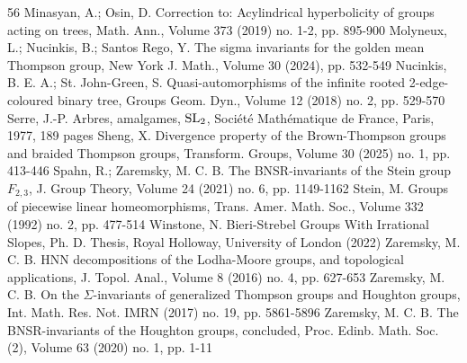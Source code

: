 \begin{thebibliography}{56}
Minasyan, A.; Osin, D. Correction to: Acylindrical hyperbolicity of groups acting on trees, Math. Ann., Volume 373 (2019) no. 1-2, pp. 895-900
Molyneux, L.; Nucinkis, B.; Santos Rego, Y. The sigma invariants for the golden mean Thompson group, New York J. Math., Volume 30 (2024), pp. 532-549
Nucinkis, B. E. A.; St. John-Green, S. Quasi-automorphisms of the infinite rooted 2-edge-coloured binary tree, Groups Geom. Dyn., Volume 12 (2018) no. 2, pp. 529-570
Serre, J.-P. Arbres, amalgames, ${\rm {SL}}_{2}$, Société Mathématique de France, Paris, 1977, 189 pages
Sheng, X. Divergence property of the Brown-Thompson groups and braided Thompson groups, Transform. Groups, Volume 30 (2025) no. 1, pp. 413-446
Spahn, R.; Zaremsky, M. C. B. The BNSR-invariants of the Stein group ${F}_{2,3}$, J. Group Theory, Volume 24 (2021) no. 6, pp. 1149-1162
Stein, M. Groups of piecewise linear homeomorphisms, Trans. Amer. Math. Soc., Volume 332 (1992) no. 2, pp. 477-514
Winstone, N. Bieri-Strebel Groups With Irrational Slopes, Ph. D. Thesis, Royal Holloway, University of London (2022)
Zaremsky, M. C. B. HNN decompositions of the Lodha-Moore groups, and topological applications, J. Topol. Anal., Volume 8 (2016) no. 4, pp. 627-653
Zaremsky, M. C. B. On the $\Sigma $-invariants of generalized Thompson groups and Houghton groups, Int. Math. Res. Not. IMRN (2017) no. 19, pp. 5861-5896
Zaremsky, M. C. B. The BNSR-invariants of the Houghton groups, concluded, Proc. Edinb. Math. Soc. (2), Volume 63 (2020) no. 1, pp. 1-11
\end{thebibliography}
